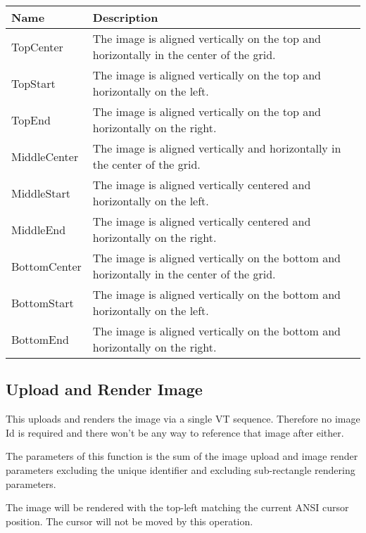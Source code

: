 \documentclass{article}
\begin{document}
\begin{tabular}{ |l|l| }
    \hline
    \textbf{Name}          & \textbf{Description} \\
    \hline
    TopCenter     & The image is aligned vertically on the top and horizontally in the center of the grid. \\
    TopStart      & The image is aligned vertically on the top and horizontally on the left. \\
    TopEnd        & The image is aligned vertically on the top and horizontally on the right. \\
    \hline
    MiddleCenter  & The image is aligned vertically and horizontally in the center of the grid. \\
    MiddleStart   & The image is aligned vertically centered and horizontally on the left. \\
    MiddleEnd     & The image is aligned vertically centered and horizontally on the right. \\
    \hline
    BottomCenter  & The image is aligned vertically on the bottom and horizontally in the center of the grid. \\
    BottomStart   & The image is aligned vertically on the bottom and horizontally on the left. \\
    BottomEnd     & The image is aligned vertically on the bottom and horizontally on the right. \\
    \hline
\end{tabular}

\subsection{Upload and Render Image}

This uploads and renders the image via a single VT sequence. Therefore no image Id
is required and there won't be any way to reference that image after either.

The parameters of this function is the sum of the image upload and image render parameters excluding the unique
identifier and excluding sub-rectangle rendering parameters.

The image will be rendered with the top-left matching the current ANSI cursor position.
The cursor will not be moved by this operation.
\end{document}
